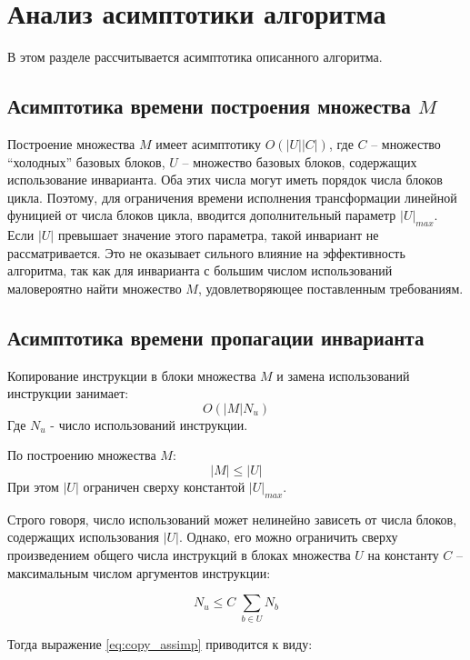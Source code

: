 \section{Анализ асимптотики алгоритма}

В этом разделе рассчитывается асимптотика описанного алгоритма.

\subsection{Асимптотика времени построения множества $M$}
Построение множества $M$ имеет асимптотику $ O(|U| |C|) $, где $C$ -- множество \enquote{холодных} базовых блоков, $U$ -- множество базовых блоков, содержащих использование инварианта.
Оба этих числа могут иметь порядок числа блоков цикла.
Поэтому, для ограничения времени исполнения трансформации линейной фуницией от числа блоков цикла, вводится дополнительный параметр $|U|_{max}$.
Если $|U|$ превышает значение этого параметра, такой инвариант не рассматривается.
Это не оказывает сильного влияние на эффективность алгоритма, так как для инварианта с большим числом использований маловероятно найти множество $M$, удовлетворяющее поставленным требованиям.

\subsection{Асимптотика времени пропагации инварианта}

Копирование инструкции в блоки множества $M$ и замена использований инструкции занимает:
\begin{equation} \label{eq:copy_assimp}
    O(|M| N_u)
\end{equation}
Где $N_u$ - число использований инструкции.

По построению множества $M$:
$$ |M| \leq |U| $$
При этом $|U|$ ограничен сверху константой $|U|_{max}$.

Строго говоря, число использований может нелинейно зависеть от числа блоков, содержащих использования $|U|$.
Однако, его можно ограничить сверху произведением общего числа инструкций в блоках множества $U$ на константу $C$ -- максимальным числом аргументов инструкции:

\begin{equation} \label{eq:sum_leq_one}
N_u \leq C \; \sum_{b \in U} N_b
\end{equation}

Тогда выражение \ref{eq:copy_assimp} приводится к виду:

